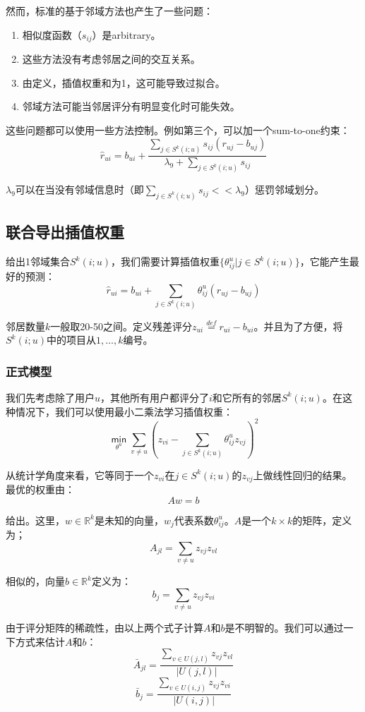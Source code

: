 \documentclass{article}
\begin{document}
 然而，标准的基于邻域方法也产生了一些问题：
 \begin{enumerate}
 \item 相似度函数（$s_{ij}$）是arbitrary。
 \item 这些方法没有考虑邻居之间的交互关系。
 \item 由定义，插值权重和为1，这可能导致过拟合。
 \item 邻域方法可能当邻居评分有明显变化时可能失效。
 \end{enumerate}

 这些问题都可以使用一些方法控制。例如第三个，可以加一个sum-to-one约束：
 $$ \hat{r}_{ui}=b_{ui}+\frac{\sum_{j\in S^k(i;u)}s_{ij}(r_{uj}-b_{uj})}{\lambda_9+\sum_{j\in S^k(i;u)}s_{ij}} $$

 $\lambda_9$可以在当没有邻域信息时（即$\sum_{j\in S^k(i;u)}s_{ij}<<\lambda_9$）惩罚邻域划分。

 \subsection{联合导出插值权重}
 给出1邻域集合$S^k(i;u)$，我们需要计算插值权重$\{\theta_{ij}^u|j\in S^k(i;u)\}$，它能产生最好的预测：
 $$ \hat{r}_{ui}=b_{ui}+\mathop{\sum}\limits_{j\in S^k(i;u)}\theta_{ij}^u(r_{uj}-b_{uj}) $$

 邻居数量$k$一般取20-50之间。定义残差评分$z_{ui}\mathop{=}\limits^{def}r_{ui}-b_{ui}$。并且为了方便，将$S^k(i;u)$中的项目从$1,\dots,k$编号。

 \subsubsection{正式模型}
 我们先考虑除了用户$u$，其他所有用户都评分了$i$和它所有的邻居$S^k(i;u)$。在这种情况下，我们可以使用最小二乘法学习插值权重：
 $$ \mathop{\mathsf{min}}\limits_{\theta^u}\mathop{\sum}\limits_{v\neq u}\left(z_{vi}-\mathop{\sum}\limits_{j\in S^k(i;u)}\theta_{ij}^uz_{vj}\right)^2 $$

 从统计学角度来看，它等同于一个$z_{vi}$在$j\in S^k(i;u)$的$z_{vj}$上做线性回归的结果。最优的权重由：
 $$ Aw=b $$

 给出。这里，$w\in\mathbb{R}^k$是未知的向量，$w_j$代表系数$\theta_{ij}^u$。$A$是一个$k\times k$的矩阵，定义为；
 $$ A_{jl}=\mathop{\sum}\limits_{v\neq u}z_{vj}z_{vl} $$

 相似的，向量$b\in\mathbb{R}^k$定义为：
 $$ b_j=\mathop{\sum}\limits_{v\neq u}z_{vj}z_{vi} $$

 由于评分矩阵的稀疏性，由以上两个式子计算$A$和$b$是不明智的。我们可以通过一下方式来估计$A$和$b$：
 $$ \bar{A}_{jl}=\frac{\sum_{v\in U(j,l)}z_{vj}z_{vl}}{|U(j,l)|} $$
 $$ \bar{b}_{j}=\frac{\sum_{v\in U(i,j)}z_{vj}z_{vi}}{|U(i,j)|} $$
\end{document}

